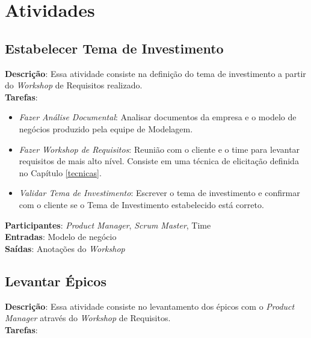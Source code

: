 \section{Atividades}

\subsection{Estabelecer Tema de Investimento}

  \textbf{Descrição}: Essa atividade consiste na definição do tema de investimento a partir do \textit{Workshop} de Requisitos realizado.\\

  \textbf{Tarefas}:

  \begin{itemize}
  
    \item \indent \textit{Fazer Análise Documental}: Analisar documentos da empresa e o modelo de negócios produzido pela equipe de Modelagem.
   
   \item \indent \textit{Fazer Workshop de Requisitos}: Reunião com o cliente e o time para levantar requisitos de mais alto nível. Consiste
   em uma técnica de elicitação definida no Capítulo \ref{tecnicas}.

   \item \indent \textit{Validar Tema de Investimento}: Escrever o tema de investimento e confirmar com o cliente se
   o Tema de Investimento estabelecido está correto.
  \end{itemize}

  \textbf{Participantes}: \textit{Product Manager}, \textit{Scrum Master}, Time \\

  \textbf{Entradas}: Modelo de negócio \\

  \textbf{Saídas}: Anotações do \textit{Workshop} \\

\subsection{Levantar Épicos}
  \textbf{Descrição}: Essa atividade consiste no levantamento dos épicos com o \textit{Product Manager} através do  \textit{Workshop} de Requisitos. \\

  \textbf{Tarefas}:

